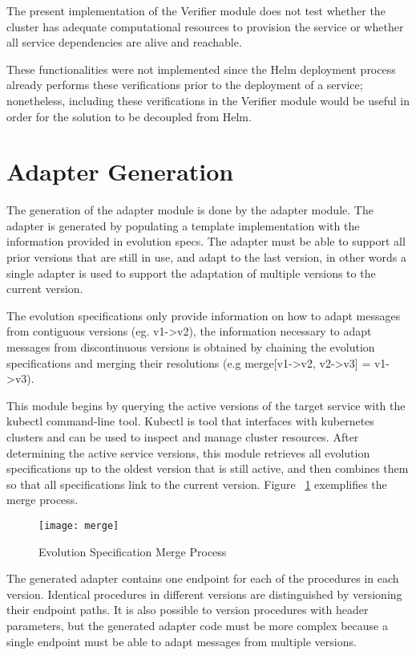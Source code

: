 The present implementation of the Verifier module does not test whether the cluster has adequate computational resources to provision the service or whether all service dependencies are alive and reachable.

These functionalities were not implemented since the Helm deployment process already performs these verifications prior to the deployment of a service;
nonetheless, including these verifications in the Verifier module would be useful in order for the solution to be decoupled from Helm.

\newpage

\section{Adapter Generation} %
\label{sec:adapter_generation}

The generation of the adapter module is done by the adapter module.
The adapter is generated by populating a template implementation with the information provided in evolution specs.
The adapter must be able to support all prior versions that are still in use, and adapt to the last version, in other words
a single adapter is used to support the adaptation of multiple versions to the current version.

The evolution specifications only provide information on how to adapt messages from contiguous versions (eg. v1->v2),
the information necessary to adapt messages from discontinuous versions is obtained by chaining the evolution specifications and
merging their resolutions (e.g merge[v1->v2, v2->v3] = v1->v3).

This module begins by querying the active versions of the target service with the kubectl command-line tool.
Kubectl is tool that interfaces with kubernetes clusters and can be used to inspect and manage cluster resources.
After determining the active service versions, this module retrieves all evolution specifications up to the oldest version that is still active,
and then combines them so that all specifications link to the current version. Figure ~\ref{fig:merge} exemplifies the merge process.

\begin{figure}[htbp]
    \centering
    \texttt{[image: merge]}
    \caption{Evolution Specification Merge Process}
    \label{fig:merge}
\end{figure}

The generated adapter contains one endpoint for each of the procedures in each version.
Identical procedures in different versions are distinguished by versioning their endpoint paths.
It is also possible to version procedures with header parameters,
but the generated adapter code must be more complex because a single endpoint must be able to adapt messages from multiple versions.

